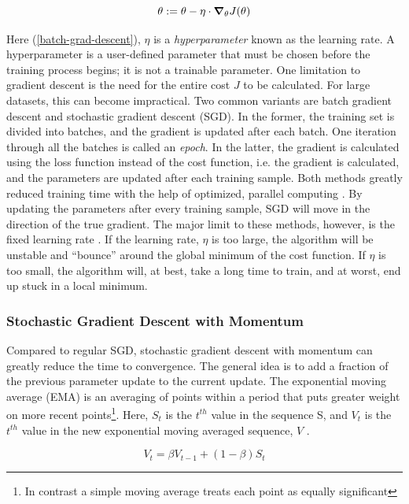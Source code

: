 \begin{equation}
    \label{batch-grad-descent}
    \theta := \theta - \eta \cdot \grad_\theta J(\theta)
\end{equation}

\noindent Here (\ref{batch-grad-descent}), $ \eta $ is a \textit{hyperparameter} known as the learning rate. A hyperparameter is a user-defined parameter that must be chosen before the training process begins; it is not a trainable parameter. One limitation to gradient descent is the need for the entire cost $ J $ to be calculated. For large datasets, this can become impractical. Two common variants are batch gradient descent and stochastic gradient descent (SGD). In the former, the training set is divided into batches, and the gradient is updated after each batch. One iteration through all the batches is called an \textit{epoch}. In the latter, the gradient is calculated using the loss function instead of the cost function, i.e. the gradient is calculated, and the parameters are updated after each training sample. Both methods greatly reduced training time with the help of optimized, parallel computing \cite{stoch-grad-desc-parallel}. By updating the parameters after every training sample, SGD will move in the direction of the true gradient. The major limit to these methods, however, is the fixed learning rate \cite{grad-desc-limits}. If the learning rate, $ \eta $ is too large, the algorithm will be unstable and ``bounce'' around the global minimum of the cost function. If $ \eta $ is too small, the algorithm will, at best, take a long time to train, and at worst, end up stuck in a local minimum. 

\subsubsection{Stochastic Gradient Descent with Momentum}
Compared to regular SGD, stochastic gradient descent with momentum \cite{grad-desc-with-mom-orig} can greatly reduce the time to convergence. The general idea is to add a fraction of the previous parameter update to the current update. The exponential moving average (EMA) is an averaging of points within a period that puts greater weight on more recent points\footnote{In contrast a simple moving average treats each point as equally significant}. Here, $ S_t $ is the $ t^{th} $  value in the sequence S, and $ V_t $ is the $ t^{th} $  value in the new exponential moving averaged sequence, $ V $ .

\begin{equation}
    \label{eq:SGD-w-momentum}
    V_t = \beta V_{t-1} + (1 - \beta)S_t
\end{equation}

